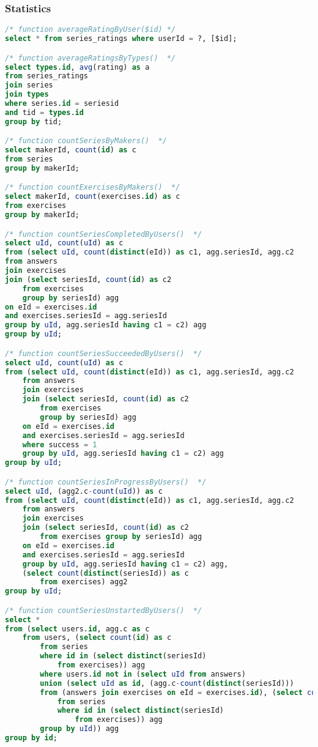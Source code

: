 \subsubsection{Statistics}
\begin{lstlisting}[language=sql]
/* function averageRatingByUser($id) */
select * from series_ratings where userId = ?, [$id];

/* function averageRatingsByTypes()  */
select types.id, avg(rating) as a
from series_ratings
join series
join types
where series.id = seriesid
and tid = types.id
group by tid;

/* function countSeriesByMakers()  */
select makerId, count(id) as c
from series
group by makerId;

/* function countExercisesByMakers()  */
select makerId, count(exercises.id) as c
from exercises
group by makerId;

/* function countSeriesCompletedByUsers()  */
select uId, count(uId) as c
from (select uId, count(distinct(eId)) as c1, agg.seriesId, agg.c2
from answers
join exercises
join (select seriesId, count(id) as c2
    from exercises
    group by seriesId) agg
on eId = exercises.id
and exercises.seriesId = agg.seriesId
group by uId, agg.seriesId having c1 = c2) agg
group by uId;

/* function countSeriesSucceededByUsers()  */
select uId, count(uId) as c
from (select uId, count(distinct(eId)) as c1, agg.seriesId, agg.c2
    from answers
    join exercises
    join (select seriesId, count(id) as c2
        from exercises
        group by seriesId) agg
    on eId = exercises.id
    and exercises.seriesId = agg.seriesId
    where success = 1
    group by uId, agg.seriesId having c1 = c2) agg
group by uId;

/* function countSeriesInProgressByUsers()  */
select uId, (agg2.c-count(uId)) as c
from (select uId, count(distinct(eId)) as c1, agg.seriesId, agg.c2
    from answers
    join exercises
    join (select seriesId, count(id) as c2
        from exercises group by seriesId) agg
    on eId = exercises.id
    and exercises.seriesId = agg.seriesId
    group by uId, agg.seriesId having c1 = c2) agg,
    (select count(distinct(seriesId)) as c
        from exercises) agg2
group by uId;

/* function countSeriesUnstartedByUsers()  */
select *
from (select users.id, agg.c as c
    from users, (select count(id) as c
        from series
        where id in (select distinct(seriesId)
            from exercises)) agg
        where users.id not in (select uId from answers)
        union (select uId as id, (agg.c-count(distinct(seriesId)))
        from (answers join exercises on eId = exercises.id), (select count(id) as c
            from series
            where id in (select distinct(seriesId)
                from exercises)) agg
        group by uId)) agg
group by id;


\end{lstlisting}
